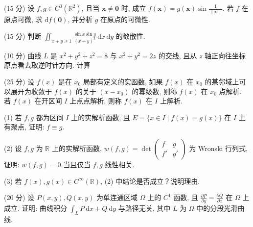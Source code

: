 (15 分) 设 $f, g \in C^0(\mathbb{R}^2)$, 且当 $\pmb{x} \neq \pmb{0}$ 时, 成立 $f(\pmb{x}) = g(\pmb{x}) \sin \frac{1}{\|\pmb{x}\|}$. 若 $f$ 在原点可微, 求 $\mathrm{d}f(\mathbf{0})$, 并分析 $g$ 在原点的可微性.\par
(15 分) 判断 $\iint_{x + y \geq 1} \frac{\sin x \sin y}{(x + y)^3} \, \mathrm{d}x \, \mathrm{d}y$ 的敛散性.\par
\par{}
(10 分) 曲线 $L$ 是 $x^{2} + y^{2} + z^{2} = 8$ 与 $x^{2} + y^{2} = 2z$ 的交线, 且从 $z$ 轴正向往坐标原点看去取逆时针方向. 计算\par
\nopagebreak[4]
(25 分) 设 $f(x)$ 是在 $x_0$ 局部有定义的实函数, 如果 $f(x)$ 在 $x_0$ 的某邻域上可以展开为收敛于 $f(x)$ 的关于 $(x - x_0)$ 的幂级数, 则称 $f(x)$ 在 $x_0$ 点解析. 若 $f(x)$ 在开区间 $I$ 上点点解析, 则称 $f(x)$ 在 $I$ 上解析.\par
(1) 若 $f, g$ 都为区间 $I$ 上的实解析函数, 且 $E = \{x \in I \mid f(x) = g(x)\}$ 在 $I$ 上有聚点, 证明: $f \equiv g$.\par
(2) 设 $f, g$ 为 $\mathbb{R}$ 上的实解析函数, $w(f, g) = \det \left( \begin{array}{cc} f & g \\ f' & g' \end{array} \right)$ 为 Wronski 行列式, 证明: $w(f, g) = 0$ 当且仅当 $f, g$ 线性相关.\par
(3) 若 $f(x), g(x) \in C^{\infty}(\mathbb{R})$, (2) 中结论是否成立？说明理由.\par
(20 分) 设 $P(x, y), Q(x, y)$ 为单连通区域 $\Omega$ 上的 $C^1$ 函数, 且 $\frac{\partial P}{\partial y} = \frac{\partial Q}{\partial x}$ 在 $\Omega$ 上成立. 证明: 曲线积分 $\int_{L} P \mathrm{~d}x + Q \mathrm{~d}y$ 与路径无关, 其中 $L$ 为 $\Omega$ 中的分段光滑曲线.\par
